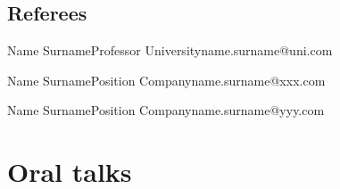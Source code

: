 \documentclass[letterpaper, 10pt, yearbullet]{techcv}
\begin{document}
\begin{paracol}{2}
\section{Referees}

\begin{referees}
\item{Name Surname}{Professor}
    {University}{name.surname@uni.com}
\item{Name Surname}{Position}
    {Company}{name.surname@xxx.com}
\item{Name Surname}{Position}
    {Company}{name.surname@yyy.com}
\end{referees}


\end{paracol}

\newpage

\section{Oral talks}

\begin{eventlist}
\end{eventlist}


%
%

\nocite{*}
\printbibtabular[title=Publications from *.bib ]
\end{document}
